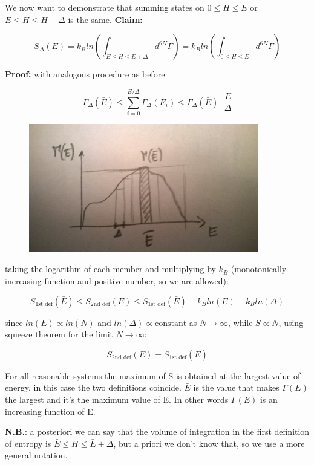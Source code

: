 \documentclass[a4paper, italian, openany]{book}
\begin{document}
We now want to demonstrate that summing states on $0 \le H \le E$ or $E \le H \le H + \Delta$ is the same.\newline
\textbf{Claim:}

$$S_{\Delta}(E) = k_B ln (\int_{E \le H \le E + \Delta} d^{6N} \Gamma) =k_B ln (\int_{0 \le H \le E} d^{6N} \Gamma)$$

\textbf{Proof:} with analogous procedure as before

$$\Gamma_{\Delta}(\bar{E}) \le \sum_{i=0}^{E/\Delta} \Gamma_{\Delta}(E_i) \le \Gamma_{\Delta}(\bar{E}) \cdot \frac{E}{\Delta}$$

\begin{figure}[H]
\centering
\includegraphics[width=100mm]{img/figure6.jpg}
\end{figure}

taking the logarithm of each member and multiplying by $k_B$ (monotonically increasing function and positive number, so we are allowed):

$$S_{\mbox{1st def}}(\bar{E}) \le S_{\mbox{2nd def}}(E) \le S_{\mbox{1st def}}(\bar{E}) + k_B ln (E) - k_B ln(\Delta)$$

since $ln(E) \propto ln(N)$ and $ ln(\Delta) \propto \mbox{constant}$ as $N \to \infty$, while $S \propto N$, using squeeze theorem for the limit $N \to \infty$:

$$S_{\mbox{2nd def}}(E) = S_{\mbox{1st def}}(\bar{E})$$

For all reasonable systems the maximum of S is obtained at the largest value of energy, in this case the two definitions coincide. $\bar{E}$ is the value that makes $\Gamma(E)$ the largest and it's the maximum value of E. In other words $\Gamma(E)$ is an increasing function of E.

\textbf{N.B.}: a posteriori we can say that the volume of integration in the first definition of entropy is $\bar{E} \le H \le \bar{E} + \Delta$, but a priori we don't know that, so we use a more general notation.
\end{document}

